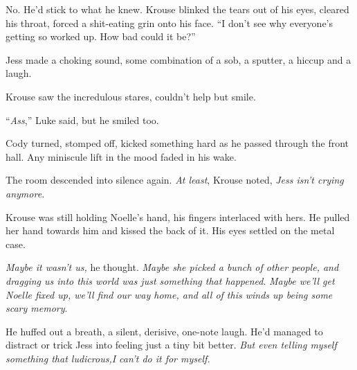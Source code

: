 No.  He'd stick to what he knew.  Krouse blinked the tears out of his eyes, cleared his throat, forced a shit-eating grin onto his face.  ``I don't see why everyone's getting so worked up.  How bad could it be?''



Jess made a choking sound, some combination of a sob, a sputter, a hiccup and a laugh.



Krouse saw the incredulous stares, couldn't help but smile.



``\emph{Ass},'' Luke said, but he smiled too.



Cody turned, stomped off, kicked something hard as he passed through the front hall.  Any miniscule lift in the mood faded in his wake.



The room descended into silence again.  \emph{At least}, Krouse noted, \emph{Jess isn't crying anymore.}



Krouse was still holding Noelle's hand, his fingers interlaced with hers.  He pulled her hand towards him and kissed the back of it.  His eyes settled on the metal case.



\emph{Maybe it wasn't us,} he thought.  \emph{Maybe she picked a bunch of other people, and dragging us into this world was just something that happened}.  \emph{Maybe we'll get Noelle fixed up, we'll find our way home, and all of this winds up being some scary memory}.



He huffed out a breath, a silent, derisive, one-note laugh.  He'd managed to distract or trick Jess into feeling just a tiny bit better.  \emph{But even telling myself something that ludicrous,}\emph{I can't do it for myself.}





